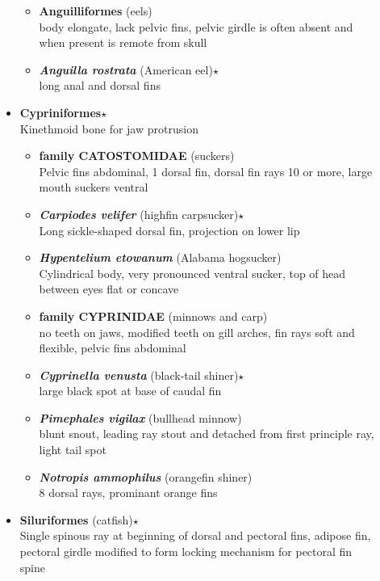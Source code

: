 \documentclass[a4paper,12pt]{article}
\begin{document}
\begin{description}
\begin{itemize}
  \begin{itemize}
    \item{\textbf{Anguilliformes} (eels)} \\ body elongate, lack pelvic fins, pelvic girdle is often absent and when present is remote from skull
    \item{\textbf{\textit{   Anguilla rostrata}} (American eel)$\star$} \\ long anal and dorsal fins
  \end{itemize}
  \item{\textbf{Cypriniformes}$\star$} \\ Kinethmoid bone for jaw protrusion
  \begin{itemize}
    \item{\textbf{family CATOSTOMIDAE} (suckers)} \\ Pelvic fins abdominal, 1 dorsal fin, dorsal fin rays 10 or more, large mouth suckers ventral
    \item{\textbf{\textit{   Carpiodes velifer}} (highfin carpsucker)$\star$} \\ Long sickle-shaped dorsal fin, projection on lower lip
    \item{\textbf{\textit{   Hypentelium etowanum}} (Alabama hogsucker)} \\ Cylindrical body, very pronounced ventral sucker, top of head between eyes flat or concave
    \item{\textbf{family CYPRINIDAE} (minnows and carp)} \\ no teeth on jaws, modified teeth on gill arches, fin rays soft and flexible, pelvic fins abdominal
    \item{\textbf{\textit{   Cyprinella venusta}} (black-tail shiner)$\star$} \\ large black spot at base of caudal fin
    \item{\textbf{\textit{   Pimephales vigilax}} (bullhead minnow)} \\ blunt snout, leading ray stout and detached from first principle ray, light tail spot
    \item{\textbf{\textit{   Notropis ammophilus}} (orangefin shiner)} \\ 8 dorsal rays, prominant orange fins
  \end{itemize}
  \item{\textbf{Siluriformes} (catfish)$\star$} \\ Single spinous ray at beginning of dorsal and pectoral fins, adipose fin, pectoral girdle modified to form locking mechanism for pectoral fin spine

\end{itemize}
\end{description}
\end{document}
